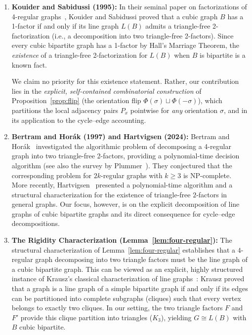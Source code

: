 \documentclass[11pt,reqno]{amsart}
\theoremstyle{definition}
\theoremstyle{remark}
\begin{document}
\begin{enumerate}[(1)]
    \item \textbf{Kouider and Sabidussi (1995):} In their seminal paper on factorizations of 4-regular graphs~\cite{KS95}, Kouider and Sabidussi proved that a cubic graph $B$ has a 1-factor if and only if its line graph $L(B)$ admits a triangle-free 2-factorization (i.e., a decomposition into two triangle-free 2-factors). Since every cubic bipartite graph has a 1-factor by Hall's Marriage Theorem, the \emph{existence} of a triangle-free 2-factorization for $L(B)$ when $B$ is bipartite is a known fact.
    
    We claim no priority for this existence statement. Rather, our contribution lies in the \emph{explicit, self-contained combinatorial construction} of Proposition~\ref{prop:flip} (the orientation flip $\Phi(\sigma) \sqcup \Phi(-\sigma)$), which partitions the local adjacency pairs $P_x$ pointwise for \emph{any} orientation $\sigma$, and in its application to the cycle--edge accounting.
    
    \item \textbf{Bertram and Hor\'ak (1997) and Hartvigsen (2024):} Bertram and Hor\'ak~\cite{BH97} investigated the algorithmic problem of decomposing a 4-regular graph into two triangle-free 2-factors, providing a polynomial-time decision algorithm (see also the survey by Plummer~\cite{Pl07}). They conjectured that the corresponding problem for $2k$-regular graphs with $k \ge 3$ is NP-complete. More recently, Hartvigsen~\cite{Hartvigsen24} presented a polynomial-time algorithm and a structural characterization for the existence of triangle-free $2$-factors in general graphs. Our focus, however, is on the explicit decomposition of line graphs of cubic bipartite graphs and its direct consequence for cycle--edge decompositions.
    
    \item \textbf{The Rigidity Characterization (Lemma~\ref{lem:four-regular}):} The structural characterization of Lemma~\ref{lem:four-regular} establishes that a $4$-regular graph decomposing into two triangle factors must be the line graph of a cubic bipartite graph. This can be viewed as an explicit, highly structured instance of Krausz's classical characterization of line graphs~\cite{Krausz43}: Krausz proved that a graph is a line graph of a simple bipartite graph if and only if its edges can be partitioned into complete subgraphs (cliques) such that every vertex belongs to exactly two cliques. In our setting, the two triangle factors $F$ and $F'$ provide this clique partition into triangles ($K_3$), yielding $G \cong L(B)$ with $B$ cubic bipartite.
\end{enumerate}
\end{document}
